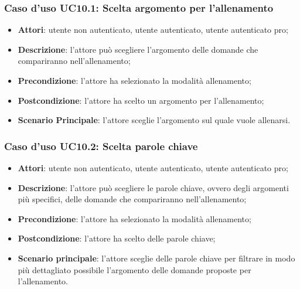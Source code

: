 \subsubsection{Caso d'uso UC10.1: Scelta argomento per l'allenamento}
	\begin{itemize}
		\item \textbf{Attori}: utente non autenticato, utente autenticato, utente autenticato pro;
		\item \textbf{Descrizione}: l'attore può scegliere l'argomento delle domande che compariranno nell'allenamento;
		\item \textbf{Precondizione}: l'attore ha selezionato la modalità allenamento;
		\item \textbf{Postcondizione}: l'attore ha scelto un argomento per l'allenamento;
		\item \textbf{Scenario Principale}: l'attore sceglie l'argomento sul quale vuole allenarsi.
	\end{itemize}
	
\subsubsection{Caso d'uso UC10.2: Scelta parole chiave}
	\begin{itemize}
		\item \textbf{Attori}: utente non autenticato, utente autenticato, utente autenticato pro;
		\item \textbf{Descrizione}: l'attore può scegliere le parole chiave, ovvero degli argomenti più specifici, delle domande che compariranno nell'allenamento;
		\item \textbf{Precondizione}: l'attore ha selezionato la modalità allenamento;
		\item \textbf{Postcondizione}: l'attore ha scelto delle parole chiave;
		\item \textbf{Scenario principale}: l'attore sceglie delle parole chiave per filtrare in modo più dettagliato possibile l'argomento delle domande proposte per l'allenamento.
	\end{itemize}
	
